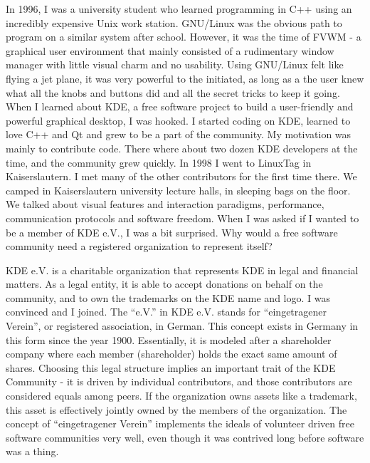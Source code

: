 

\noindent{}In 1996, I was a university student who learned programming
in C++ using an incredibly expensive Unix work station. GNU/Linux was the
obvious path to program on a similar system after school. However, it
was the time of FVWM - a graphical user environment that mainly
consisted of a rudimentary window manager with little visual charm
and no usability. Using GNU/Linux felt like flying a jet plane, it was
very powerful to the 
initiated, as long as a the user knew what all the knobs and buttons
did and all the secret tricks to keep it going. When I learned about
KDE, a free software project to build a 
user-friendly and powerful graphical desktop, I was hooked. I
started coding on KDE, learned to love C++ and Qt and grew to be a
part of the community. My motivation was mainly to contribute
code. There where about two dozen KDE developers at the 
time, and the community grew quickly. In 1998 I went to LinuxTag in
Kaiserslautern. I met many of the other contributors for the first
time there. We camped in Kaiserslautern university lecture halls, in sleeping bags
on the floor. We talked about
visual features and interaction paradigms, performance, communication
protocols and software freedom. When I was asked if I wanted to be a
member of KDE e.V., I was a bit surprised. Why would a free software
community need a registered organization to represent itself?

KDE e.V. is a charitable organization that represents KDE
in legal and financial matters. As a legal entity, it is able to 
accept donations on behalf on the community, and to own the trademarks
on the KDE name and logo. I was convinced and I joined. The ``e.V.''
in KDE e.V. stands for ``eingetragener Verein'', or registered
association, in German. This concept exists in Germany in this form
since the year 1900. Essentially, it is modeled after a shareholder
company where each member (shareholder) holds the exact same amount of
shares. Choosing this legal structure implies an important trait of the
KDE Community - it is driven by individual contributors, and those
contributors are considered equals among peers. If the organization
owns assets like a trademark, this asset is effectively jointly owned
by the members of the organization. The concept of ``eingetragener
Verein'' implements the ideals of volunteer driven free software
communities very well, even though it was contrived long before
software was a thing.

